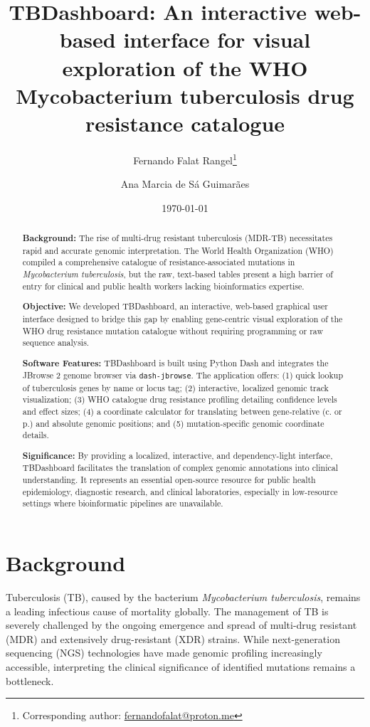 \documentclass{article}
\title{TBDashboard: An interactive web-based interface for visual exploration of the WHO Mycobacterium tuberculosis drug resistance catalogue}
\author{Fernando Falat Rangel\thanks{Corresponding author: \href{mailto:fernandofalat@proton.me}{fernandofalat@proton.me}} \and Ana Marcia de S\'a Guimar\~aes}
\date{\today}
\begin{document}
\maketitle

\begin{abstract}
\noindent\textbf{Background:} The rise of multi-drug resistant tuberculosis (MDR-TB) necessitates rapid and accurate genomic interpretation. The World Health Organization (WHO) compiled a comprehensive catalogue of resistance-associated mutations in \textit{Mycobacterium tuberculosis}, but the raw, text-based tables present a high barrier of entry for clinical and public health workers lacking bioinformatics expertise.

\medskip
\noindent\textbf{Objective:} We developed TBDashboard, an interactive, web-based graphical user interface designed to bridge this gap by enabling gene-centric visual exploration of the WHO drug resistance mutation catalogue without requiring programming or raw sequence analysis.

\medskip
\noindent\textbf{Software Features:} TBDashboard is built using Python Dash and integrates the JBrowse 2 genome browser via \texttt{dash-jbrowse}. The application offers: (1) quick lookup of tuberculosis genes by name or locus tag; (2) interactive, localized genomic track visualization; (3) WHO catalogue drug resistance profiling detailing confidence levels and effect sizes; (4) a coordinate calculator for translating between gene-relative (c. or p.) and absolute genomic positions; and (5) mutation-specific genomic coordinate details.

\medskip
\noindent\textbf{Significance:} By providing a localized, interactive, and dependency-light interface, TBDashboard facilitates the translation of complex genomic annotations into clinical understanding. It represents an essential open-source resource for public health epidemiology, diagnostic research, and clinical laboratories, especially in low-resource settings where bioinformatic pipelines are unavailable.
\end{abstract}

\clearpage

\section{Background}
Tuberculosis (TB), caused by the bacterium \textit{Mycobacterium tuberculosis}, remains a leading infectious cause of mortality globally. The management of TB is severely challenged by the ongoing emergence and spread of multi-drug resistant (MDR) and extensively drug-resistant (XDR) strains. While next-generation sequencing (NGS) technologies have made genomic profiling increasingly accessible, interpreting the clinical significance of identified mutations remains a bottleneck.
\end{document}
